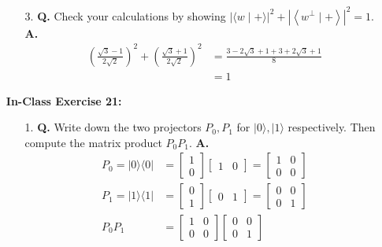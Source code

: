 \documentclass[main.tex]{subfiles}
\begin{document}
\begin{enumerate}
\begin{enumerate}
    \item[3.] \textbf{Q.} Check your calculations by showing $|\langle w \mid+\rangle|^{2}+\left|\left\langle w^{\perp} \mid+\right\rangle\right|^{2}=1$. \textbf{A.}
        \begin{align*}
            \left(\frac{\sqrt{3}-1}{2\sqrt{2}}\right)^2 + \left( \frac{\sqrt{3}+1}{2\sqrt{2}} \right)^2 & = \frac{3 -2\sqrt{3} + 1 + 3 +2\sqrt{3} + 1}{8}\\
                                                                                                        & = 1
        \end{align*}
    \end{enumerate}

\item[] \textbf{In-Class Exercise 21:}

    \begin{enumerate}
    \item[1.] \textbf{Q.} Write down the two projectors $P_{0}, P_{1}$ for $|0\rangle,|1\rangle$ respectively. Then compute the matrix product $P_{0} P_{1}$. \textbf{A.}
        \begin{align*}
            P_{0} = |0 \rangle \langle 0|   & = \left[\begin{array}{c} 1 \\ 0 \end{array}\right] \left[\begin{array}{ll} 1 & 0 \end{array}\right] = \left[\begin{array}{ll} 1 & 0 \\ 0 & 0 \end{array}\right]\\
            P_{1} = |1 \rangle \langle 1|   & = \left[\begin{array}{c} 0 \\ 1 \end{array}\right] \left[\begin{array}{ll} 0 & 1 \end{array}\right] = \left[\begin{array}{ll} 0 & 0 \\ 0 & 1 \end{array}\right]\\
            P_{0}P_{1}                      & = \left[\begin{array}{ll} 1 & 0 \\ 0 & 0 \end{array}\right] \left[\begin{array}{ll} 0 & 0 \\ 0 & 1 \end{array}\right]\\

\end{align*}
\end{enumerate}
\end{enumerate}
\end{document}
